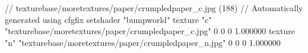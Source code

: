 // texturebase/moretextures/paper/crumpledpaper_c.jpg (188)
// Automatically generated using cfgfix
setshader "bumpworld"
texture "c" "texturebase/moretextures/paper/crumpledpaper_c.jpg" 0 0 0 1.000000
texture "n" "texturebase/moretextures/paper/crumpledpaper_n.jpg" 0 0 0 1.000000
